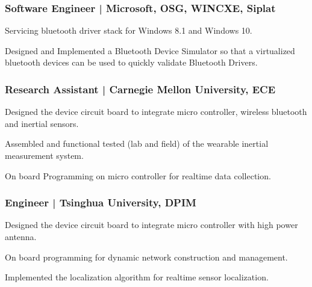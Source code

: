 \documentclass[]{deedy-resume-new}
\begin{document}
\sectionsep
\subsubsection{Software Engineer | Microsoft, OSG, WINCXE, Siplat}
\begin{tightemize}
\item Servicing bluetooth driver stack for Windows 8.1 and Windows 10.
\item Designed and Implemented a Bluetooth Device Simulator so that a virtualized bluetooth devices can be used to quickly validate Bluetooth Drivers.
\end{tightemize}
\sectionsep

\subsubsection{Research Assistant | Carnegie Mellon University, ECE}
\begin{tightemize}
\item Designed the device circuit board to integrate micro controller, wireless bluetooth and inertial sensors.
\item Assembled and functional tested (lab and field) of the wearable inertial measurement system.
\item On board Programming on micro controller for realtime data collection.
\end{tightemize}
\sectionsep

\subsubsection{Engineer | Tsinghua University, DPIM}
\begin{tightemize}
\item Designed the device circuit board to integrate micro controller with high power antenna.
\item On board programming for dynamic network construction and management.
\item Implemented the localization algorithm for realtime sensor localization.
\end{tightemize}
\sectionsep
\end{document}
